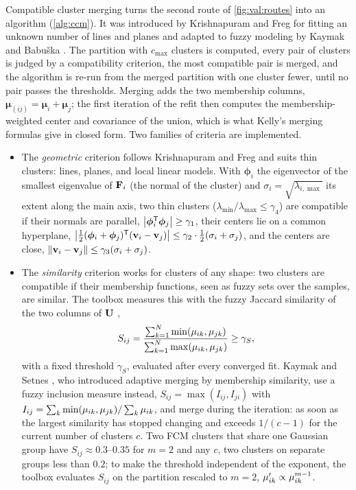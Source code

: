 Compatible cluster merging turns the second route of \cref{fig:val:routes} into an algorithm (\cref{alg:ccm}). It was introduced by Krishnapuram and Freg \cite{krishnapuram:1992:merging} for fitting an unknown number of lines and planes and adapted to fuzzy modeling by Kaymak and Babu\v{s}ka \cite{kaymak:1995:merging}. The partition with $c_{\max}$ clusters is computed, every pair of clusters is judged by a compatibility criterion, the most compatible pair is merged, and the algorithm is re-run from the merged partition with one cluster fewer, until no pair passes the thresholds. Merging adds the two membership columns, $\boldsymbol\mu_{(ij)}=\boldsymbol\mu_i+\boldsymbol\mu_j$; the first iteration of the refit then computes the membership-weighted center and covariance of the union, which is what Kelly's merging formulas \cite{kelly:1994:merging} give in closed form. Two families of criteria are implemented.
\begin{itemize}
  \item The \emph{geometric} criterion follows Krishnapuram and Freg and suits thin clusters: lines, planes, and local linear models. With $\boldsymbol\phi_i$ the eigenvector of the smallest eigenvalue of $\mathbf{F}_i$ (the normal of the cluster) and $\sigma_i=\sqrt{\lambda_{i,\max}}$ its extent along the main axis, two thin clusters ($\lambda_{\min}/\lambda_{\max}\le\gamma_4$) are compatible if their normals are parallel, $\left\lvert \boldsymbol\phi_i^{\mathsf{T}}\boldsymbol\phi_j \right\rvert\ge\gamma_1$, their centers lie on a common hyperplane, $\left\lvert \tfrac12(\boldsymbol\phi_i+\boldsymbol\phi_j)^{\mathsf{T}}(\mathbf{v}_i-\mathbf{v}_j) \right\rvert\le\gamma_2\cdot\tfrac12(\sigma_i+\sigma_j)$, and the centers are close, $\left\lVert \mathbf{v}_i-\mathbf{v}_j \right\rVert\le\gamma_3(\sigma_i+\sigma_j)$.
  \item The \emph{similarity} criterion works for clusters of any shape: two clusters are compatible if their membership functions, seen as fuzzy sets over the samples, are similar. The toolbox measures this with the fuzzy Jaccard similarity of the two columns of $\mathbf{U}$ \cite{setnes:1998:similarity},
  \begin{equation}
    S_{ij}=\frac{\sum_{k=1}^{N}\min(\mu_{ik},\mu_{jk})}{\sum_{k=1}^{N}\max(\mu_{ik},\mu_{jk})}\ge\gamma_S,
    \label{eq:val:similarity}
  \end{equation}
  with a fixed threshold $\gamma_S$, evaluated after every converged fit. Kaymak and Setnes \cite{kaymak:2002:volume}, who introduced adaptive merging by membership similarity, use a fuzzy inclusion measure instead, $S_{ij}=\max(I_{ij},I_{ji})$ with $I_{ij}=\sum_k\min(\mu_{ik},\mu_{jk})/\sum_k\mu_{ik}$, and merge during the iteration: as soon as the largest similarity has stopped changing and exceeds $1/(c-1)$ for the current number of clusters $c$. Two FCM clusters that share one Gaussian group have $S_{ij}\approx0.3$--$0.35$ for $m=2$ and any $c$, two clusters on separate groups less than $0.2$; to make the threshold independent of the exponent, the toolbox evaluates $S_{ij}$ on the partition rescaled to $m=2$, $\mu_{ik}'\propto\mu_{ik}^{m-1}$.
\end{itemize}
